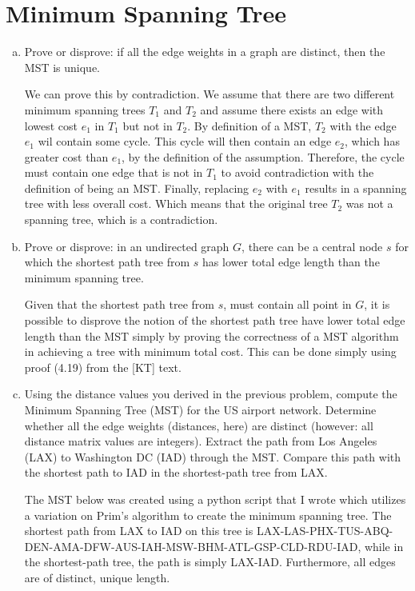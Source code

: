 \documentclass[12pt]{article}
\begin{document}
\section{Minimum Spanning Tree}\label{minimum spanning tree}
\begin{enumerate}[(a)]
\item Prove or disprove: if all the edge weights in a graph are distinct, then the MST is unique.
\begin{addmargin}[2em]{2em}
We can prove this by contradiction. We assume that there are two different minimum spanning trees $T_1$ and $T_2$ and assume there exists an edge with lowest cost $e_1$ in $T_1$ but not in $T_2$. By definition of a MST, $T_2$ with the edge $e_1$ wil contain some cycle. This cycle will then contain an edge $e_2$, which has greater cost than $e_1$, by the definition of the assumption. Therefore, the cycle must contain one edge that is not in $T_1$ to avoid contradiction with the definition of being an MST. Finally, replacing $e_2$ with $e_1$ results in a spanning tree with less overall cost. Which means that the original tree $T_2$ was not a spanning tree, which is a contradiction.
\end{addmargin}
\item Prove or disprove: in an undirected graph $G$, there can be a central node $s$ for which the shortest path tree from $s$ has lower total edge length than the minimum spanning tree.
\begin{addmargin}[2em]{2em}
Given that the shortest path tree from $s$, must contain all point in $G$, it is possible to disprove the notion of the shortest path tree have lower total edge length than the MST simply by proving the correctness of a MST algorithm in achieving a tree with minimum total cost. This can be done simply using proof (4.19) from the [KT] text.
\end{addmargin}
\item Using the distance values you derived in the previous problem, compute the Minimum Spanning Tree (MST) for the US airport network. Determine whether all the edge weights (distances, here) are distinct (however: all distance matrix values are integers). Extract the path from Los Angeles (LAX) to Washington DC (IAD) through the MST. Compare this path with the shortest path to IAD in the shortest-path tree from LAX.
\begin{addmargin}[2em]{2em}
The MST below was created using a python script that I wrote which utilizes a variation on Prim's algorithm to create the minimum spanning tree. The shortest path from LAX to IAD on this tree is LAX-LAS-PHX-TUS-ABQ-DEN-AMA-DFW-AUS-IAH-MSW-BHM-ATL-GSP-CLD-RDU-IAD, while in the shortest-path tree, the path is simply LAX-IAD. Furthermore, all edges are of distinct, unique length.

\end{addmargin}
\end{enumerate}
\end{document}
